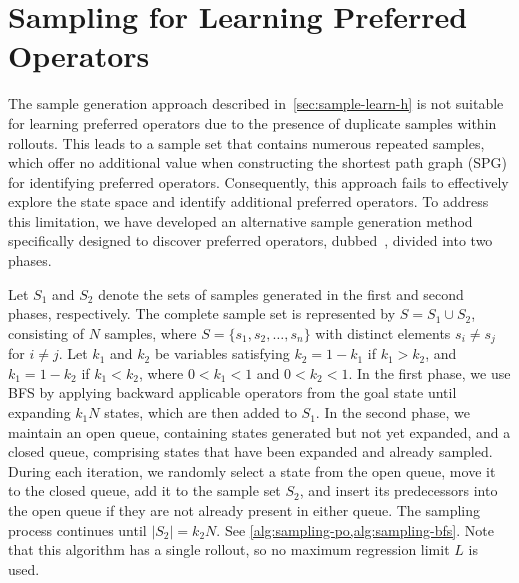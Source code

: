 \documentclass[ppgc,diss,english]{iiufrgs}
\begin{document}
\section{Sampling for Learning Preferred Operators}
\label{sec:sample-learn-po}
The sample generation approach described in~\cref{sec:sample-learn-h} is not suitable for learning preferred operators due to the presence of duplicate samples within rollouts. This leads to a sample set that contains numerous repeated samples, which offer no additional value when constructing the shortest path graph (SPG) for identifying preferred operators. Consequently, this approach fails to effectively explore the state space and identify additional preferred operators. To address this limitation, we have developed an alternative sample generation method specifically designed to discover preferred operators, dubbed~\bfsrs, divided into two phases.

Let $S_1$ and $S_2$ denote the sets of samples generated in the first and second phases, respectively. The complete sample set is represented by $S = S_1 \cup S_2$, consisting of $N$ samples, where $S = \{ s_1, s_2, \ldots, s_n\}$ with distinct elements $s_i \neq s_j$ for $i \neq j$. Let $k_1$ and $k_2$ be variables satisfying $k_2 = 1 - k_1$ if $k_1 > k_2$, and $k_1 = 1 - k_2$ if $k_1 < k_2$, where $0 < k_1 < 1$ and $0 < k_2 < 1$.
In the first phase, we use BFS by applying backward applicable operators from the goal state until expanding $k_1N$ states, which are then added to $S_1$.
In the second phase, we maintain an open queue, containing states generated but not yet expanded, and a closed queue, comprising states that have been expanded and already sampled. During each iteration, we randomly select a state from the open queue, move it to the closed queue, add it to the sample set $S_2$, and insert its predecessors into the open queue if they are not already present in either queue. The sampling process continues until $|S_2| = k_2N$. See \cref{alg:sampling-po,alg:sampling-bfs}. Note that this algorithm has a single rollout, so no maximum regression limit $L$ is used.
\end{document}
